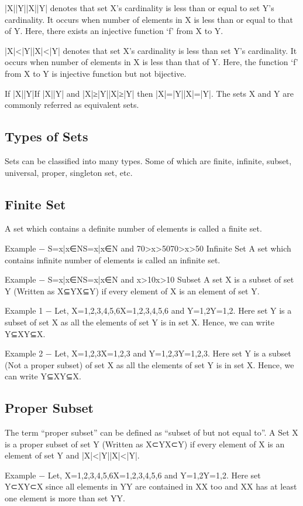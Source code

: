 \documentclass[12pt]{article}
\begin{document}
{|X|\leq|Y||X|\leq|Y| denotes that set X’s cardinality is less than or equal to set Y’s cardinality. It occurs when number of elements in X is less than or equal to that of Y. Here, there exists an injective function ‘f’ from X to Y.

|X|<|Y||X|<|Y| denotes that set X’s cardinality is less than set Y’s cardinality. It occurs when number of elements in X is less than that of Y. Here, the function ‘f’ from X to Y is injective function but not bijective.

If |X|\leq|Y|If |X|\leq|Y| and |X|≥|Y||X|≥|Y| then |X|=|Y||X|=|Y|. The sets X and Y are commonly referred as equivalent sets.

\subsection{Types of Sets}
Sets can be classified into many types. Some of which are finite, infinite, subset, universal, proper, singleton set, etc.

\subsection{Finite Set}
A set which contains a definite number of elements is called a finite set.

Example − S={x|x∈NS={x|x∈N and 70>x>50}70>x>50}
Infinite Set
A set which contains infinite number of elements is called an infinite set.

Example − S={x|x∈NS={x|x∈N and x>10}x>10}
Subset
A set X is a subset of set Y (Written as X⊆YX⊆Y) if every element of X is an element of set Y.

Example 1 − Let, X={1,2,3,4,5,6}X={1,2,3,4,5,6} and Y={1,2}Y={1,2}. Here set Y is a subset of set X as all the elements of set Y is in set X. Hence, we can write Y⊆XY⊆X.

Example 2 − Let, X={1,2,3}X={1,2,3} and Y={1,2,3}Y={1,2,3}. Here set Y is a subset (Not a proper subset) of set X as all the elements of set Y is in set X. Hence, we can write Y⊆XY⊆X.

\subsection{Proper Subset}
The term “proper subset” can be defined as “subset of but not equal to”. A Set X is a proper subset of set Y (Written as X⊂YX⊂Y) if every element of X is an element of set Y and |X|<|Y||X|<|Y|.

Example − Let, X={1,2,3,4,5,6}X={1,2,3,4,5,6} and Y={1,2}Y={1,2}. Here set Y⊂XY⊂X since all elements in YY are contained in XX too and XX has at least one element is more than set YY.

}
\end{document}
